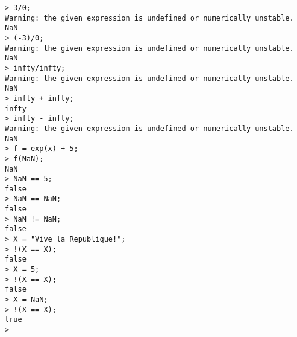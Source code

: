 \begin{center}\begin{minipage}{15cm}\begin{Verbatim}[frame=single]
> 3/0;
Warning: the given expression is undefined or numerically unstable.
NaN
> (-3)/0;
Warning: the given expression is undefined or numerically unstable.
NaN
> infty/infty;
Warning: the given expression is undefined or numerically unstable.
NaN
> infty + infty;
infty
> infty - infty;
Warning: the given expression is undefined or numerically unstable.
NaN
> f = exp(x) + 5;
> f(NaN);
NaN
> NaN == 5;
false
> NaN == NaN;
false
> NaN != NaN;
false
> X = "Vive la Republique!";
> !(X == X);
false
> X = 5;
> !(X == X);
false
> X = NaN;
> !(X == X);
true
> 
\end{Verbatim}
\end{minipage}\end{center}
